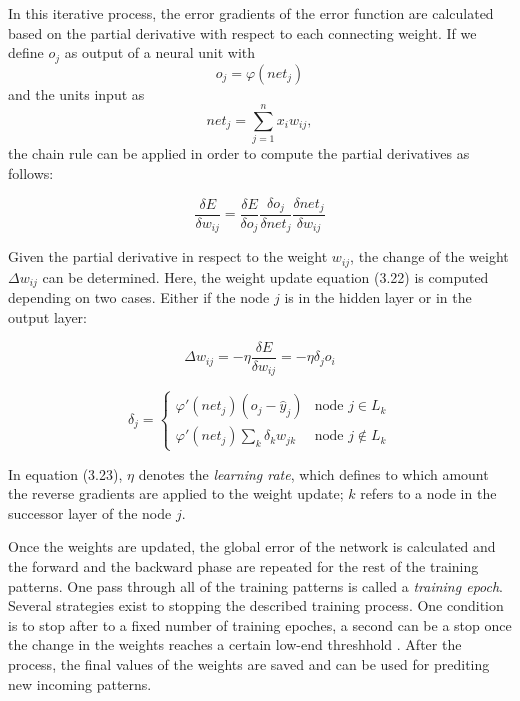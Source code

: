 In this iterative process, the error gradients of the error function are calculated based on the partial derivative with respect to each connecting weight. If we define $o_j$ as output of a neural unit with
\begin{equation}
  o_j = \varphi(net_j)
\end{equation}
and the units input as
\begin{equation}
  net_j = \sum_{j=1}^{n}x_{i}w_{ij},
\end{equation}
the chain rule can be applied in order to compute the partial derivatives as follows:

\begin{equation}
  \frac{\delta E}{\delta w_{ij}} = \frac{\delta E}{\delta o_j} \frac{\delta o_j}{\delta net_j} \frac{\delta net_j}{\delta w_{ij}}
\end{equation}

Given the partial derivative in respect to the weight $w_{ij}$, the change of the weight $\Delta w_{ij}$ can be determined. Here, the weight update equation (3.22) is computed depending on two cases. Either if the node $j$ is in the hidden layer or in the output layer:

\begin{equation}
  \Delta w_{ij} = -\eta \frac{\delta E}{\delta w_{ij}} = - \eta \delta_j o_i
\end{equation}

\begin{equation}
  \delta_j =
  \begin{cases}
    \varphi'(net_j)(o_j - \hat{y}_j) & \text{node $j \in L_k$}\\
    \varphi'(net_j) \sum_k \delta_k w_{jk} & \text{node $j \notin L_k$}
  \end{cases}
\end{equation}

In equation (3.23), $\eta$ denotes the \textit{learning rate}, which defines to which amount the reverse gradients are applied to the weight update; $k$ refers to a node in the successor layer of the node $j$.

Once the weights are updated, the global error of the network is calculated and the forward and the backward phase are repeated for the rest of the training patterns. One pass through all of the training patterns is called a \textit{training epoch}. Several strategies exist to stopping the described training process. One condition is to stop after to a fixed number of training epoches, a second can be a stop once the change in the weights reaches a certain low-end threshhold \cite{Haykin:1998:NNC:521706}. After the process, the final values of the weights are saved and can be used for prediting new incoming patterns.

